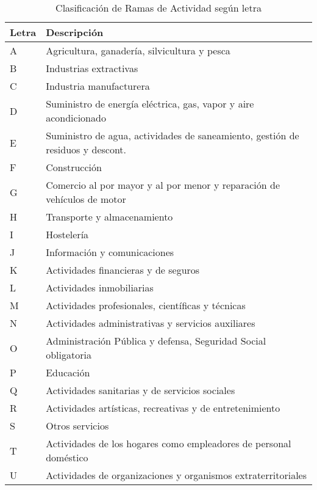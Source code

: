 \appendix

\section{}

\begin{table}[h!]
\centering
\begin{tabular}{ll}
\hline
Letra & Descripción \\
\hline
A & Agricultura, ganadería, silvicultura y pesca \\
B & Industrias extractivas \\
C & Industria manufacturera \\
D & Suministro de energía eléctrica, gas, vapor y aire acondicionado \\
E & Suministro de agua, actividades de saneamiento, gestión de residuos y descont.\\
F & Construcción \\
G & Comercio al por mayor y al por menor y reparación de vehículos de motor\\
H & Transporte y almacenamiento \\
I & Hostelería \\
J & Información y comunicaciones \\
K & Actividades financieras y de seguros \\
L & Actividades inmobiliarias \\
M & Actividades profesionales, científicas y técnicas \\
N & Actividades administrativas y servicios auxiliares \\
O & Administración Pública y defensa, Seguridad Social obligatoria \\
P & Educación \\
Q & Actividades sanitarias y de servicios sociales \\
R & Actividades artísticas, recreativas y de entretenimiento \\
S & Otros servicios \\
T & Actividades de los hogares como empleadores de personal doméstico \\
U & Actividades de organizaciones y organismos extraterritoriales \\
\hline
\end{tabular}
\caption{Clasificación de Ramas de Actividad según letra}
\end{table}
